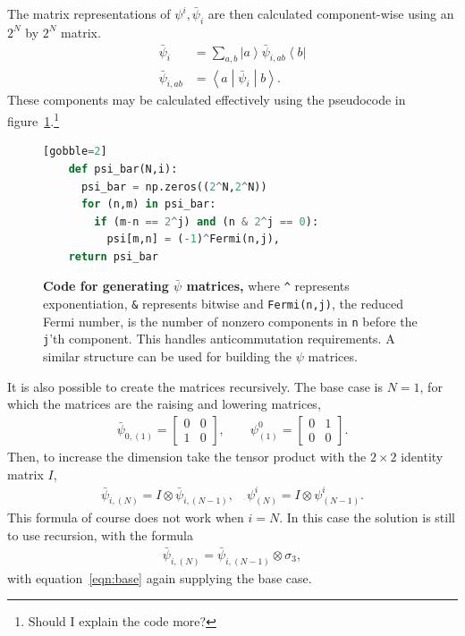 \documentclass[12pt]{article} %
\newcommand{\ket}[1]{\left|#1\right\rangle}
\newcommand{\bra}[1]{\left\langle#1\right|}
\newcommand{\brakett}[3]{\left\langle#1\middle|#2\middle|#3\right\rangle}
\newcommand{\nn}{\nonumber\\}
\begin{document}
The matrix representations of $\psi^i, \bar \psi_i$ are then calculated component-wise using an $2^N$ by $2^N$ matrix.
\begin{align}
\bar\psi_i &= \sum_{a,b}\ket{a}\bar\psi_{i,ab}\bra{b}\nn
\bar\psi_{i,ab} &= \brakett{a}{\bar\psi_i}{b}.\label{eqn:comps}
\end{align}
These components may be calculated effectively using the pseudocode in figure~\ref{code:psibar}.\footnote{Should I explain the code more?}

\begin{figure}[ht]
	\begin{lstlisting}[language=python][gobble=2]
    def psi_bar(N,i):
      psi_bar = np.zeros((2^N,2^N))
      for (n,m) in psi_bar:
        if (m-n == 2^j) and (n & 2^j == 0): 
          psi[m,n] = (-1)^Fermi(n,j),
    return psi_bar
		\end{lstlisting}
	\cprotect\caption{\textbf{Code for generating $\bar \psi$ matrices,} where \verb|^| represents exponentiation, \verb|&| represents bitwise and \verb|Fermi(n,j)|, the reduced Fermi number, is the number of nonzero components in \verb|n| before the \verb|j|'th component. This handles anticommutation requirements. A similar structure can be used for building the $\psi$ matrices.}
	\label{code:psibar}
\end{figure}

It is also possible to create the matrices recursively. The base case is $N=1$, for which the matrices are the raising and lowering matrices,
\begin{align}
\bar\psi_{0,(1)} = \begin{bmatrix} 0&0\\1&0 \end{bmatrix}, \qquad
    \psi^0_{(1)} = \begin{bmatrix} 0&1\\0&0 \end{bmatrix}. \label{eqn:base}
\end{align}
Then, to increase the dimension take the tensor product with the $2\times 2$ identity matrix $I$,
\begin{align}
\bar\psi_{i,(N)} = I\otimes\bar\psi_{i,(N-1)},\quad \psi^i_{(N)} = I\otimes 
	\psi^i_{(N-1)}.
\end{align}
This formula of course does not work when $i=N$. In this case the solution is still to use recursion, with the formula
\begin{align}
\bar\psi_{i,(N)} = \bar\psi_{i,(N-1)}\otimes\sigma_3,
\end{align}
with equation~\ref{eqn:base} again supplying the base case.
\end{document}

